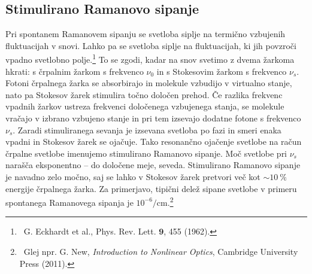 \subsection*{Stimulirano Ramanovo sipanje}
Pri spontanem Ramanovem sipanju se svetloba siplje na termično vzbujenih fluktuacijah
v snovi. Lahko pa se svetloba siplje na fluktuacijah, ki jih povzroči vpadno
svetlobno polje.\footnote{~G. Eckhardt et al., Phys. Rev. Lett.
$\mathbf{9}$, 455 (1962).} To se zgodi, kadar na snov svetimo z dvema žarkoma hkrati: 
s črpalnim žarkom s frekvenco $\nu_0$ in s Stokesovim žarkom s frekvenco $\nu_s$. 
Fotoni črpalnega žarka se absorbirajo in molekule vzbudijo v virtualno stanje, nato pa 
Stokesov žarek stimulira točno določen prehod. Če razlika frekvenc vpadnih 
žarkov ustreza frekvenci določenega vzbujenega stanja, se  molekule vračajo
v izbrano vzbujeno stanje in pri tem izsevajo dodatne fotone s frekvenco $\nu_s$. Zaradi
stimuliranega sevanja je izsevana svetloba po fazi in smeri enaka vpadni in Stokesov
žarek se ojačuje. Tako resonančno ojačenje svetlobe na račun črpalne svetlobe imenujemo stimulirano  
Ramanovo sipanje. Moč svetlobe pri $\nu_s$  narašča eksponentno -- do določene meje, seveda.
Stimulirano Ramanovo sipanje je navadno zelo močno, saj se lahko v Stokesov žarek pretvori 
več kot $\sim 10~\%$ energije črpalnega žarka. Za primerjavo, tipični delež sipane svetlobe v primeru 
spontanega Ramanovega sipanja je $10^{-6}/\si{\centi\meter}$.\footnote{~Glej npr. 
G. New, {\it Introduction to Nonlinear Optics}, Cambridge University Press (2011).}


